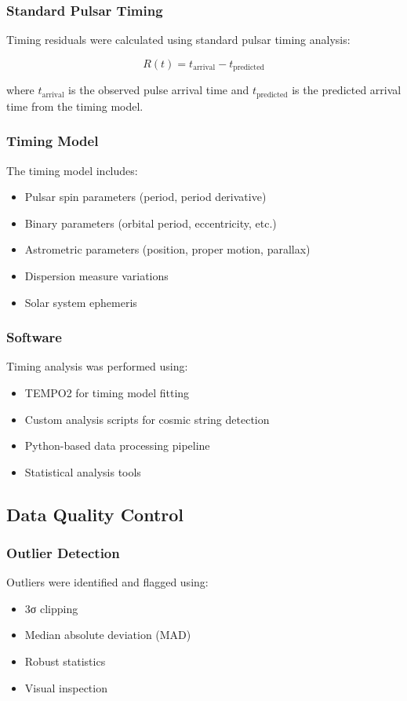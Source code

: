 \subsubsection{Standard Pulsar Timing}
Timing residuals were calculated using standard pulsar timing analysis:

\begin{equation}
R(t) = t_{\text{arrival}} - t_{\text{predicted}}
\end{equation}

where $t_{\text{arrival}}$ is the observed pulse arrival time and $t_{\text{predicted}}$ is the predicted arrival time from the timing model.

\subsubsection{Timing Model}
The timing model includes:
\begin{itemize}
    \item Pulsar spin parameters (period, period derivative)
    \item Binary parameters (orbital period, eccentricity, etc.)
    \item Astrometric parameters (position, proper motion, parallax)
    \item Dispersion measure variations
    \item Solar system ephemeris
\end{itemize}

\subsubsection{Software}
Timing analysis was performed using:
\begin{itemize}
    \item TEMPO2 for timing model fitting
    \item Custom analysis scripts for cosmic string detection
    \item Python-based data processing pipeline
    \item Statistical analysis tools
\end{itemize}

\subsection{Data Quality Control}

\subsubsection{Outlier Detection}
Outliers were identified and flagged using:
\begin{itemize}
    \item 3σ clipping
    \item Median absolute deviation (MAD)
    \item Robust statistics
    \item Visual inspection
\end{itemize}

